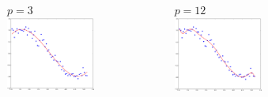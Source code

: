 \documentclass[handout]{beamer}
\begin{document}
\begin{frame}
\begin{columns}
\begin{figure}
\end{figure}
\vspace{-2em}
\begin{figure}
$p=3$
\includegraphics[width=0.99\textwidth]{./fig/L1/linreg_pow3.png}
\end{figure}
\vspace{-2em}
\begin{figure}
$p=12$
\includegraphics[width=0.99\textwidth]{./fig/L1/linreg_pow12.png}
\end{figure}

\end{columns}
\end{frame}
\end{document}
